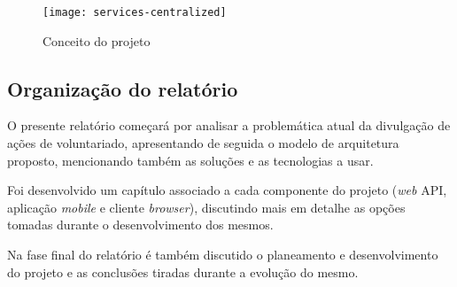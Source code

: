 \bigskip \bigskip \bigskip

\begin{figure}[h]
	\centering
	\texttt{[image: services-centralized]}
	\caption{Conceito do projeto}
\end{figure}

\subsection{Organização do relatório}

O presente relatório começará por analisar a problemática atual da divulgação de ações de voluntariado, apresentando de seguida o modelo de arquitetura proposto, mencionando também as soluções e as tecnologias a usar. \par \medskip

Foi desenvolvido um capítulo associado a cada componente do projeto (\textit{web} API, aplicação \textit{mobile} e cliente \textit{browser}), discutindo mais em detalhe as opções tomadas durante o desenvolvimento dos mesmos. \par \medskip

Na fase final do relatório é também discutido o planeamento e desenvolvimento do projeto e as conclusões tiradas durante a evolução do mesmo.
























